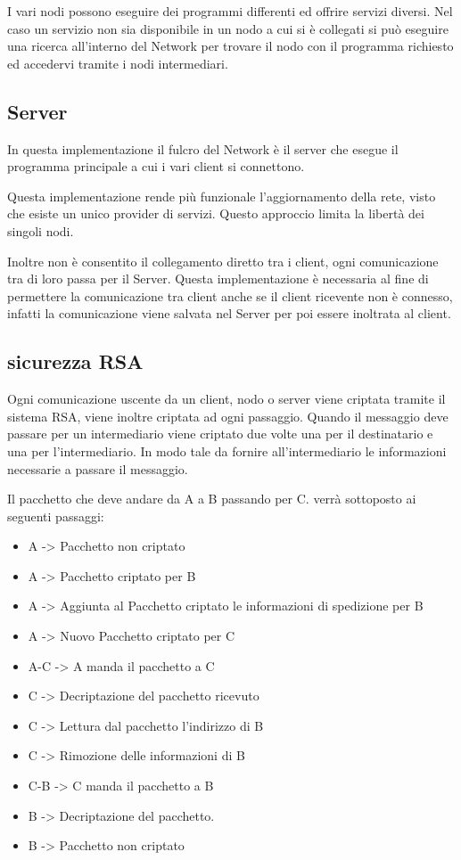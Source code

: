 \documentclass{article}
\begin{document}
I vari nodi possono eseguire dei programmi differenti ed offrire servizi diversi. Nel caso un servizio non sia disponibile in un nodo a cui si è collegati si può eseguire una ricerca all'interno del Network per trovare il nodo con il programma richiesto ed accedervi tramite i nodi intermediari.

\subsection{Server}
In questa implementazione il fulcro del Network è il server che esegue il programma principale a cui i vari client si connettono.

Questa implementazione rende più funzionale l'aggiornamento della rete, visto che esiste un unico provider di servizi. Questo approccio limita la libertà dei singoli nodi.

Inoltre non è consentito il collegamento diretto tra i client, ogni comunicazione tra di loro passa per il Server. Questa implementazione è necessaria al fine di permettere la comunicazione tra client anche se il client ricevente non è connesso, infatti la comunicazione viene salvata nel Server per poi essere inoltrata al client.

\subsection{sicurezza RSA}
Ogni comunicazione uscente da un client, nodo o server viene criptata tramite il sistema RSA, viene inoltre criptata ad ogni passaggio. Quando il messaggio deve passare per un intermediario viene criptato due volte una per il destinatario e una per l'intermediario. In modo tale da fornire all'intermediario le informazioni necessarie a passare il messaggio.

Il pacchetto che deve andare da A a B passando per C. verrà sottoposto ai seguenti passaggi:

\begin{itemize}
	\item A -> Pacchetto non criptato
	\item A -> Pacchetto criptato per B
	\item A -> Aggiunta al Pacchetto criptato le informazioni di spedizione per B
	\item A -> Nuovo Pacchetto criptato per C
	\item A-C -> A manda il pacchetto a C
	\item C -> Decriptazione del pacchetto ricevuto
	\item C -> Lettura dal pacchetto l'indirizzo di B
	\item C -> Rimozione delle informazioni di B
	\item C-B -> C manda il pacchetto a B
	\item B -> Decriptazione del pacchetto.
	\item B -> Pacchetto non criptato
\end{itemize}
\end{document}
